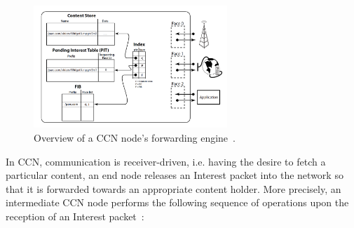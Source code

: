 \begin{figure}[h!]

    \centering
    \includegraphics[width=0.65\textwidth]{figures/ccn-node.png}
    \cprotect\caption{Overview of a CCN node's forwarding 
            engine~\cite{Jacobson2009}.}
    \label{fig:test-1-1}

\end{figure}

In CCN, communication is receiver-driven, i.e. having the desire to fetch 
a particular content, an end node releases an Interest packet into the network 
so that it is forwarded towards an appropriate content holder. More precisely, 
an intermediate CCN node performs the following sequence of operations upon the reception of 
an Interest packet~\cite{Jacobson2009}:

